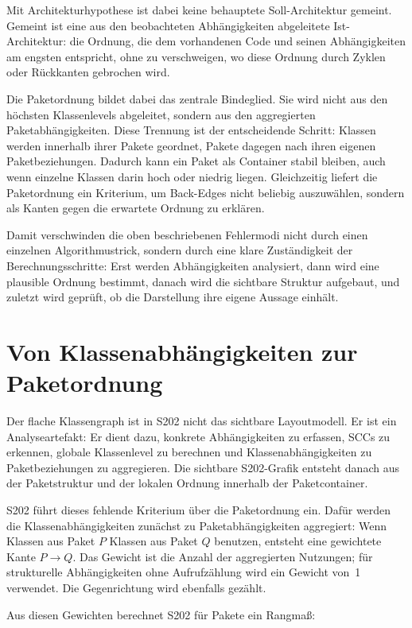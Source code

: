 \documentclass[a4paper,11pt]{article}
\begin{document}
Mit Architekturhypothese ist dabei keine behauptete Soll-Architektur gemeint.
Gemeint ist eine aus den beobachteten Abh\"angigkeiten abgeleitete
Ist-Architektur: die Ordnung, die dem vorhandenen Code und seinen Abh\"angigkeiten
am engsten entspricht, ohne zu verschweigen, wo diese Ordnung durch Zyklen oder
R\"uckkanten gebrochen wird.

Die Paketordnung bildet dabei das zentrale Bindeglied. Sie wird nicht aus den
h\"ochsten Klassenlevels abgeleitet, sondern aus den aggregierten
Paketabh\"angigkeiten. Diese Trennung ist der entscheidende Schritt: Klassen
werden innerhalb ihrer Pakete geordnet, Pakete dagegen nach ihren eigenen
Paketbeziehungen. Dadurch kann ein Paket als Container stabil bleiben, auch
wenn einzelne Klassen darin hoch oder niedrig liegen. Gleichzeitig liefert die
Paketordnung ein Kriterium, um Back-Edges nicht beliebig auszuw\"ahlen, sondern
als Kanten gegen die erwartete Ordnung zu erkl\"aren.

Damit verschwinden die oben beschriebenen Fehlermodi nicht durch einen einzelnen
Algorithmustrick, sondern durch eine klare Zust\"andigkeit der
Berechnungsschritte: Erst werden Abh\"angigkeiten analysiert, dann wird eine
plausible Ordnung bestimmt, danach wird die sichtbare Struktur aufgebaut, und
zuletzt wird gepr\"uft, ob die Darstellung ihre eigene Aussage einh\"alt.

\section{Von Klassenabh\"angigkeiten zur Paketordnung}

Der flache Klassengraph ist in S202 nicht das sichtbare Layoutmodell. Er ist
ein Analyseartefakt: Er dient dazu, konkrete Abh\"angigkeiten zu erfassen, SCCs
zu erkennen, globale Klassenlevel zu berechnen und Klassenabh\"angigkeiten zu
Paketbeziehungen zu aggregieren. Die sichtbare S202-Grafik entsteht danach aus
der Paketstruktur und der lokalen Ordnung innerhalb der Paketcontainer.

S202 f\"uhrt dieses fehlende Kriterium \"uber die Paketordnung ein. Daf\"ur
werden die Klassenabh\"angigkeiten zun\"achst zu Paketabh\"angigkeiten
aggregiert: Wenn Klassen aus Paket $P$ Klassen aus Paket $Q$ benutzen, entsteht
eine gewichtete Kante $P \to Q$. Das Gewicht ist die Anzahl der aggregierten
Nutzungen; f\"ur strukturelle Abh\"angigkeiten ohne Aufrufz\"ahlung wird ein
Gewicht von~1 verwendet. Die Gegenrichtung wird ebenfalls gez\"ahlt.

Aus diesen Gewichten berechnet S202 f\"ur Pakete ein Rangma\ss{}:
\end{document}
